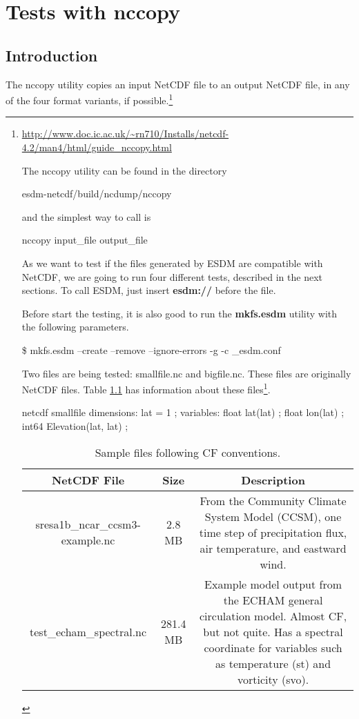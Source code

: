 \chapter{Tests with nccopy}
\label{ch:nccopy}

\section{Introduction}


The nccopy utility copies an input NetCDF file to an output NetCDF file, in any of the four format variants, if possible.\footnote{\url{http://www.doc.ic.ac.uk/~rn710/Installs/netcdf-4.2/man4/html/guide_nccopy.html}

The nccopy utility can be found in the directory

\begin{framed}
esdm-netcdf/build/ncdump/nccopy
\end{framed}

and the simplest way to call is

\begin{framed}
nccopy input\_file output\_file
\end{framed}

As we want to test if the files generated by ESDM are compatible with NetCDF, we are going to run four different tests, described in the next sections. To call ESDM, just insert \textbf{esdm://} before the file.

Before start the testing, it is also good to run the \textbf{mkfs.esdm} utility with the following parameters.

\begin{framed}
\$ mkfs.esdm --create --remove --ignore-errors -g -c \_esdm.conf
\end{framed}

Two files are being tested: smallfile.nc and bigfile.nc. These files are originally NetCDF files. Table \ref{tab:netcdf} has information about these files\footnote{\url{https://www.unidata.ucar.edu/software/netcdf/examples/files.html}}.

netcdf smallfile {
dimensions:
	lat = 1 ;
variables:
	float lat(lat) ;
	float lon(lat) ;
	int64 Elevation(lat, lat) ;
}

\begin{table}[H]
\centering
\begin{tabular}{|c|c|c|}
\hline
\multicolumn{1}{|c|}{NetCDF File}	& \multicolumn{1}{|c|}{Size} & \multicolumn{1}{|c|}{Description} \\ \hline \hline
sresa1b\_ncar\_ccsm3-example.nc & 2.8 MB & From the Community Climate System Model (CCSM), one time step of precipitation flux, air temperature, and eastward wind. \\ \hline
test\_echam\_spectral.nc & 281.4 MB & Example model output from the ECHAM general circulation model. Almost CF, but not quite. Has a spectral coordinate for variables such as temperature (st) and vorticity (svo). \\ \hline
\hline
\end{tabular}
\caption{\label{tab:netcdf} Sample files following CF conventions.}
\end{table}

}
